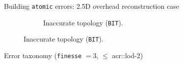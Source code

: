 \documentclass[10pt, export]{beamer}
\begin{document}
\begin{frame}{Building \texttt{atomic} errors: 2.5D overhead reconstruction case}
{\begin{figure}
\begin{center}
\begin{subfigure}{.45\textwidth}
                            \caption{\label{fig::bul_height} Inaccurate topology (\texttt{BIT}).}
                        \end{subfigure}
                    \end{center}
                \end{figure}
            }
        \end{frame}
        \begin{frame}{Error taxonomy (\texttt{finesse} $= 3$, $\leq$ \acrshort{acr::lod}-2)}
            \begin{figure}
                
            \end{figure}
        \end{frame}
\end{document}
